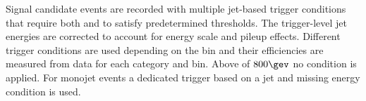

Signal candidate events are recorded with multiple jet-based trigger
conditions that require both \scalht and \alphat to satisfy
predetermined thresholds. The trigger-level jet energies are corrected
to account for energy scale and pileup effects. Different trigger
conditions are used depending on the \scalht bin and their
efficiencies are measured from data for each \njet category and
\scalht bin. Above \scalht of $800\gev$ no \alphat condition is applied. For monojet events a dedicated trigger based on a jet and missing energy condition is used.


